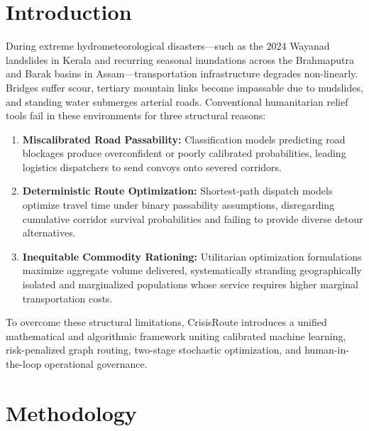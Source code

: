 \documentclass[11pt,a4paper]{article}
\begin{document}
\section{Introduction}
During extreme hydrometeorological disasters---such as the 2024 Wayanad landslides in Kerala and recurring seasonal inundations across the Brahmaputra and Barak basins in Assam---transportation infrastructure degrades non-linearly. Bridges suffer scour, tertiary mountain links become impassable due to mudslides, and standing water submerges arterial roads. Conventional humanitarian relief tools fail in these environments for three structural reasons:
\begin{enumerate}
    \item \textbf{Miscalibrated Road Passability:} Classification models predicting road blockages produce overconfident or poorly calibrated probabilities, leading logistics dispatchers to send convoys onto severed corridors.
    \item \textbf{Deterministic Route Optimization:} Shortest-path dispatch models optimize travel time under binary passability assumptions, disregarding cumulative corridor survival probabilities and failing to provide diverse detour alternatives.
    \item \textbf{Inequitable Commodity Rationing:} Utilitarian optimization formulations maximize aggregate volume delivered, systematically stranding geographically isolated and marginalized populations whose service requires higher marginal transportation costs.
\end{enumerate}

To overcome these structural limitations, CrisisRoute introduces a unified mathematical and algorithmic framework uniting calibrated machine learning, risk-penalized graph routing, two-stage stochastic optimization, and human-in-the-loop operational governance.

\section{Methodology}
\end{document}
